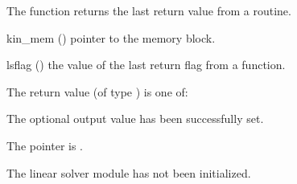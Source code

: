 {
  The function  returns the
  last return value from a {\kinspils} routine. 
}
{
  \begin{args}
  \item[kin\_mem] ()
    pointer to the {\kinsol} memory block.
  \item[lsflag] ()
    the value of the last return flag from a {\kinspils} function.
  \end{args}
}
{
  The return value  (of type ) is one of:
  \begin{args}
  \item[\Id{KINSPILS\_SUCCESS}] 
    The optional output value has been successfully set.
  \item[\Id{KINSPILS\_MEM\_NULL}]
    The  pointer is .
  \item[\Id{KINSPILS\_LMEM\_NULL}]
    The linear solver module has not been initialized.
  \end{args}
}
